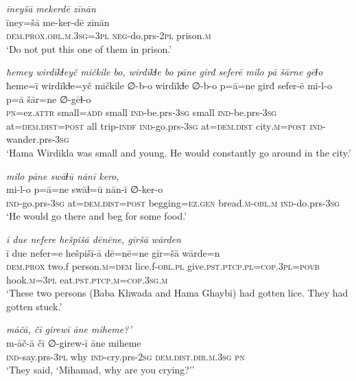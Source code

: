 \ea \label{BP.133}
\textit{īneyšā mekerdē zīnān} \\ 
\gll īney=šā me-ker-dē zīnān \\ 
 \textsc{dem.prox}\textsc{.obl}\textsc{.m}\textsc{.3sg}\textsc{=3pl} \textsc{neg-}do.prs-\textsc{2pl} prison\textsc{.m} \\ 
\glt `Do not put this one of them in prison.'
\z 
 
\ea \label{BP.143}
\textit{ħemey wirdīkɫeyč mičkile bo, wirdīkɫe bo pāne girđ seferē milo pā šārne gēɫo} \\ 
\gll ħeme=ī wirdīkɫe=yč mičkile ∅-b-o wirdīkɫe ∅-b-o p=ā=ne girđ sefer-ē mi-l-o p=ā šār=ne ∅-gēɫ-o \\ 
 \textsc{pn}=ez.\textsc{attr} small\textsc{=add} small \textsc{ind-}be.prs\textsc{-3sg} small \textsc{ind-}be.prs\textsc{-3sg} at=\textsc{dem.dist}\textsc{=\textsc{post}} all trip\textsc{-indf} \textsc{ind-}go.prs\textsc{-3sg} at=\textsc{dem.dist} city\textsc{.m}\textsc{=\textsc{post}} \textsc{ind-}wander.prs\textsc{-3sg} \\ 
\glt `Hama Wirdikla was small and young. He would constantly go around in the city.'
\z 
 
\ea \label{BP.144}
\textit{milo pāne swāɫū nānī kero,} \\ 
\gll mi-l-o p=ā=ne swāɫ=ū nān-ī ∅-ker-o \\ 
 \textsc{ind-}go.prs\textsc{-3sg} at=\textsc{dem.dist}\textsc{=\textsc{post}} begging\textsc{=ez.gen} bread\textsc{.m}\textsc{-obl}\textsc{.m} \textsc{ind-}do.prs\textsc{-3sg} \\ 
\glt `He would go there and beg for some food.'
\z 
 
\ea \label{BP.150}
\textit{ī due nefere hešpišā dēnēne, gīršā wārden} \\ 
\gll ī due nefer=e hešpišī-ā dē=nē=ne gīr=šā wārde=n \\ 
 \textsc{dem.prox} two.f person\textsc{.m}\textsc{=dem} lice.f\textsc{-obl}\textsc{.pl} give\textsc{.pst}\textsc{.ptcp}\textsc{.pl}\textsc{=cop}\textsc{.3pl}\textsc{=\textsc{povb}} hook\textsc{.m}\textsc{=3pl} eat\textsc{.pst}\textsc{.ptcp}\textsc{.m}\textsc{=cop}\textsc{.3sg}\textsc{.m} \\ 
\glt `These two persons (Baba Khwada and Hama Ghaybi) had gotten lice. They had gotten stuck.'
\z 
 
\ea \label{BP.154}
\textit{māčā, čī girewī āne miheme?’} \\ 
\gll m-āč-ā čī ∅-girew-ī āne miheme \\ 
 \textsc{ind-}say.prs\textsc{-3pl} why \textsc{ind-}cry.prs-\textsc{2sg} \textsc{dem.dist}\textsc{.dir}\textsc{.m}\textsc{.3sg} \textsc{pn} \\ 
\glt `They said, ‘Mihamad, why are you crying?’'
\z 
 

